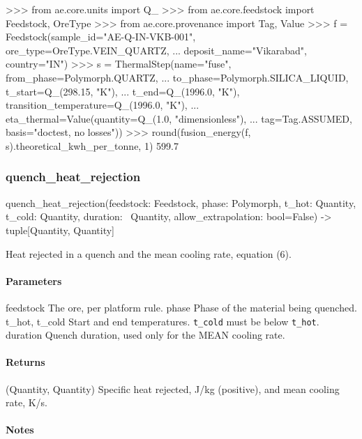 \documentclass[10pt,a4paper,twoside]{report}
\begin{document}
\begin{doctestblock}
>>> from ae.core.units import Q_
>>> from ae.core.feedstock import Feedstock, OreType
>>> from ae.core.provenance import Tag, Value
>>> f = Feedstock(sample_id="AE-Q-IN-VKB-001", ore_type=OreType.VEIN_QUARTZ,
...               deposit_name="Vikarabad", country="IN")
>>> s = ThermalStep(name="fuse", from_phase=Polymorph.QUARTZ,
...                 to_phase=Polymorph.SILICA_LIQUID, t_start=Q_(298.15, "K"),
...                 t_end=Q_(1996.0, "K"), transition_temperature=Q_(1996.0, "K"),
...                 eta_thermal=Value(quantity=Q_(1.0, "dimensionless"),
...                                   tag=Tag.ASSUMED, basis="doctest, no losses"))
>>> round(fusion_energy(f, s).theoretical_kwh_per_tonne, 1)
599.7
\end{doctestblock}

\subsubsection*{quench\_heat\_rejection}

\begin{verbatimsmall}
quench_heat_rejection(feedstock: Feedstock, phase: Polymorph, t_hot: Quantity, t_cold: Quantity, duration:
    \  Quantity, allow_extrapolation: bool=False) -> tuple[Quantity, Quantity]
\end{verbatimsmall}

Heat rejected in a quench and the mean cooling rate, equation (6).

\paragraph*{Parameters}

feedstock The ore, per platform rule. phase Phase of the material being quenched. t\_hot, t\_cold Start and end temperatures. \texttt{t\_cold} must be below \texttt{t\_hot}. duration Quench duration, used only for the MEAN cooling rate.

\paragraph*{Returns}

(Quantity, Quantity) Specific heat rejected, J/kg (positive), and mean cooling rate, K/s.

\paragraph*{Notes}
\end{document}
